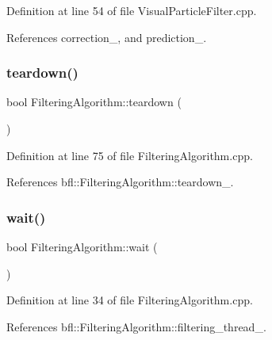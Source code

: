 Definition at line 54 of file Visual\+Particle\+Filter.\+cpp.



References correction\+\_\+, and prediction\+\_\+.

\mbox{\label{classbfl_1_1FilteringAlgorithm_a1dc912d89ee8f96d4f3e8209865c5308}} 
\subsubsection{\texorpdfstring{teardown()}{teardown()}}
{\footnotesize\ttfamily bool Filtering\+Algorithm\+::teardown (\begin{DoxyParamCaption}{ }\end{DoxyParamCaption})\hspace{0.3cm}{\ttfamily [inherited]}}



Definition at line 75 of file Filtering\+Algorithm.\+cpp.



References bfl\+::\+Filtering\+Algorithm\+::teardown\+\_\+.

\mbox{\label{classbfl_1_1FilteringAlgorithm_a40372c24fa050eb0274371172df0a244}} 
\subsubsection{\texorpdfstring{wait()}{wait()}}
{\footnotesize\ttfamily bool Filtering\+Algorithm\+::wait (\begin{DoxyParamCaption}{ }\end{DoxyParamCaption})\hspace{0.3cm}{\ttfamily [inherited]}}



Definition at line 34 of file Filtering\+Algorithm.\+cpp.



References bfl\+::\+Filtering\+Algorithm\+::filtering\+\_\+thread\+\_\+.



